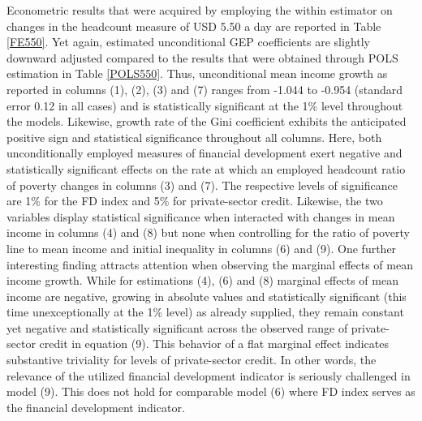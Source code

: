 \documentclass[12pt, a4paper]{article}
\begin{document}
Econometric results that were acquired by employing the within estimator on changes in the headcount measure of USD 5.50 a day are reported in Table \ref{FE550}. Yet again, estimated unconditional GEP coefficients are slightly downward adjusted compared to the results that were obtained through POLS estimation in Table \ref{POLS550}. Thus, unconditional mean income growth as reported in columns (1), (2), (3) and (7) ranges from -1.044 to -0.954 (standard error 0.12 in all cases) and is statistically significant at the 1\% level throughout the models. Likewise, growth rate of the Gini coefficient exhibits the anticipated positive sign and statistical significance throughout all columns. Here, both unconditionally employed measures of financial development exert negative and statistically significant effects on the rate at which an employed headcount ratio of poverty changes in columns (3) and (7). The respective levels of significance are 1\% for the FD index and 5\% for private-sector credit. Likewise, the two variables display statistical significance when interacted with changes in mean income in columns (4) and (8) but none when controlling for the ratio of poverty line to mean income and initial inequality in columns (6) and (9). One further interesting finding attracts attention when observing the marginal effects of mean income growth. While for estimations (4), (6) and (8) marginal effects of mean income are negative, growing in absolute values and statistically significant (this time unexceptionally at the 1\% level) as already supplied, they remain constant yet negative and statistically significant across the observed range of private-sector credit in equation (9). This behavior of a flat marginal effect indicates substantive triviality for levels of private-sector credit. In other words, the relevance of the utilized financial development indicator is seriously challenged in model (9). This does not hold for comparable model (6) where FD index serves as the financial development indicator.
\end{document}
